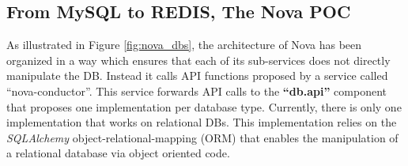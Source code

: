 


\subsection{From MySQL to REDIS, The Nova POC\label{subsec:mysql-to-redis}}

As illustrated in Figure \ref{fig:nova_dbs}, the architecture of Nova has been organized in a way which ensures that each of its sub-services does not
directly manipulate the DB. Instead it calls API functions proposed by a service called ``nova-conductor''. This service forwards API calls to the
\textbf{``db.api''} component that proposes one implementation per database type. Currently, there is only one implementation that works on
relational DBs. This implementation relies on the \emph{SQLAlchemy} object-relational-mapping (ORM) that enables the manipulation of a relational
database via object oriented code.

